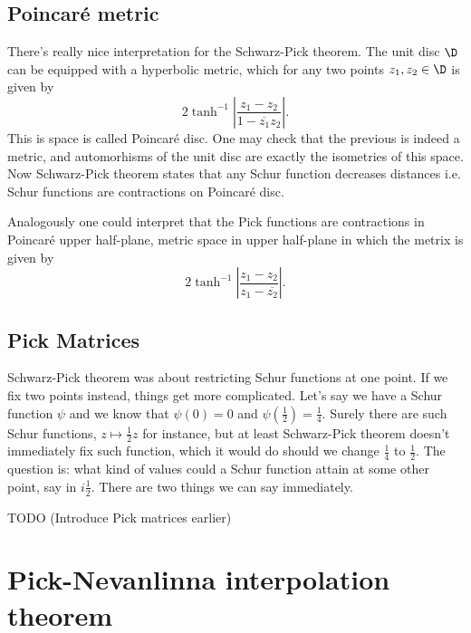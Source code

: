 \subsection{Poincaré metric}

There's really nice interpretation for the Schwarz-Pick theorem. The unit disc $\D$ can be equipped with a hyperbolic metric, which for any two points $z_{1}, z_{2} \in \D$ is given by
\[
	2 \tanh^{-1}\left|\frac{z_{1} - z_{2}}{1 - \overline{z_{1}} z_{2}}\right|.
\]
This is space is called Poincaré disc. One may check that the previous is indeed a metric, and automorhisms of the unit disc are exactly the isometries of this space. Now Schwarz-Pick theorem states that any Schur function decreases distances i.e. Schur functions are contractions on Poincaré disc.

Analogously one could interpret that the Pick functions are contractions in Poincaré upper half-plane, metric space in upper half-plane in which the metrix is given by
\[
	2 \tanh^{-1}\left|\frac{z_{1} - z_{2}}{z_{1} - \overline{z_{2}}}\right|.
\]

\subsection{Pick Matrices}

Schwarz-Pick theorem was about restricting Schur functions at one point. If we fix two points instead, things get more complicated. Let's say we have a Schur function $\psi$ and we know that $\psi(0) = 0$ and $\psi(\frac{1}{2}) = \frac{1}{4}$. Surely there are such Schur functions, $z \mapsto \frac{1}{2}z$ for instance, but at least Schwarz-Pick theorem doesn't immediately fix such function, which it would do should we change $\frac{1}{4}$ to $\frac{1}{2}$. The question is: what kind of values could a Schur function attain at some other point, say in $i \frac{1}{2}$. There are two things we can say immediately.

TODO (Introduce Pick matrices earlier)

\section{Pick-Nevanlinna interpolation theorem}


